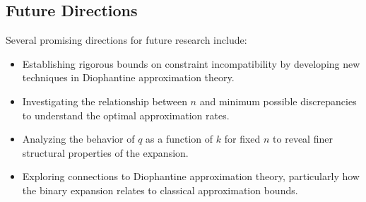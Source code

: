 \subsection{Future Directions}
Several promising directions for future research include:
\begin{itemize}
    \item Establishing rigorous bounds on constraint incompatibility by developing new techniques in Diophantine approximation theory.
    \item Investigating the relationship between $n$ and minimum possible discrepancies to understand the optimal approximation rates.
    \item Analyzing the behavior of $q$ as a function of $k$ for fixed $n$ to reveal finer structural properties of the expansion.
    \item Exploring connections to Diophantine approximation theory, particularly how the binary expansion relates to classical approximation bounds.
\end{itemize}
